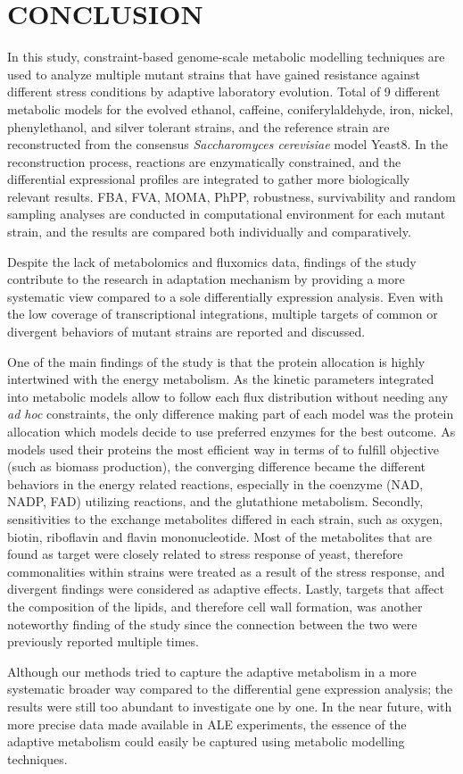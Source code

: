 
\chapter{CONCLUSION}

In this study, constraint-based genome-scale metabolic modelling techniques are used to analyze multiple mutant strains that have gained resistance against different stress conditions by adaptive laboratory evolution. Total of 9 different metabolic models for the evolved ethanol, caffeine, coniferylaldehyde, iron, nickel, phenylethanol, and silver tolerant strains, and the reference strain are reconstructed from the consensus \emph{Saccharomyces cerevisiae} model Yeast8. In the reconstruction process, reactions are enzymatically constrained, and the differential expressional profiles are integrated to gather more biologically relevant results. FBA, FVA, MOMA, PhPP, robustness, survivability and random sampling analyses are conducted in computational environment for each mutant strain, and the results are compared both individually and comparatively.

Despite the lack of metabolomics and fluxomics data, findings of the study contribute to the research in adaptation mechanism by providing a more systematic view compared to a sole differentially expression analysis. Even with the low coverage of transcriptional integrations, multiple targets of common or divergent behaviors of mutant strains are reported and discussed.

One of the main findings of the study is that the protein allocation is highly intertwined with the energy metabolism. As the kinetic parameters integrated into metabolic models allow to follow each flux distribution without needing any \emph{ad hoc} constraints, the only difference making part of each model was the protein allocation which models decide to use preferred enzymes for the best outcome. As models used their proteins the most efficient way in terms of to fulfill objective (such as biomass production), the converging difference became the different behaviors in the energy related reactions, especially in the coenzyme (NAD, NADP, FAD) utilizing reactions, and the glutathione metabolism. Secondly, sensitivities to the exchange metabolites differed in each strain, such as oxygen, biotin, riboflavin and flavin mononucleotide. Most of the metabolites that are found as target were closely related to stress response of yeast, therefore commonalities within strains were treated as a result of the stress response, and divergent findings were considered as adaptive effects. Lastly, targets that affect the composition of the lipids, and therefore cell wall formation, was another noteworthy finding of the study since the connection between the two were previously reported multiple times.

Although our methods tried to capture the adaptive metabolism in a more systematic broader way compared to the differential gene expression analysis; the results were still too abundant to investigate one by one. In the near future, with more precise data made available in ALE experiments, the essence of the adaptive metabolism could easily be captured using metabolic modelling techniques.

